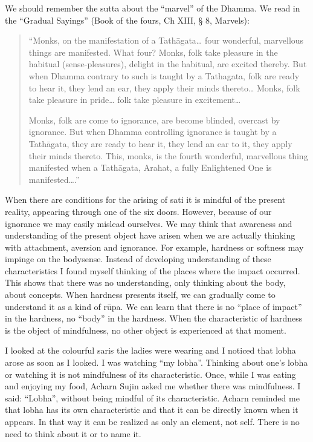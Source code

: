 We should remember the sutta about the ``marvel'' of the Dhamma. We read
in the ``Gradual Sayings'' (Book of the fours, Ch XIII, § 8, Marvels):

\begin{quote}
``Monks, on the manifestation of a Tathāgata\ldots{} four wonderful,
marvellous things are manifested. What four? Monks, folk take pleasure
in the habitual (sense-pleasures), delight in the habitual, are excited
thereby. But when Dhamma contrary to such is taught by a Tathagata, folk
are ready to hear it, they lend an ear, they apply their minds
thereto\ldots{} Monks, folk take pleasure in pride\ldots{} folk take
pleasure in excitement\ldots{}

Monks, folk are come to ignorance, are become blinded, overcast by
ignorance. But when Dhamma controlling ignorance is taught by a
Tathāgata, they are ready to hear it, they lend an ear to it, they apply
their minds thereto. This, monks, is the fourth wonderful, marvellous
thing manifested when a Tathāgata, Arahat, a fully Enlightened One is
manifested\ldots{}.''
\end{quote}

When there are conditions for the arising of sati it is mindful of the
present reality, appearing through one of the six doors. However,
because of our ignorance we may easily mislead ourselves. We may think
that awareness and understanding of the present object have arisen when
we are actually thinking with attachment, aversion and ignorance. For
example, hardness or softness may impinge on the bodysense. Instead of
developing understanding of these characteristics I found myself
thinking of the places where the impact occurred. This shows that there
was no understanding, only thinking about the body, about concepts. When
hardness presents itself, we can gradually come to understand it as a
kind of rūpa. We can learn that there is no ``place of impact'' in the
hardness, no ``body'' in the hardness. When the characteristic of
hardness is the object of mindfulness, no other object is experienced at
that moment.

I looked at the colourful saris the ladies were wearing and I noticed
that lobha arose as soon as I looked. I was watching ``my lobha''.
Thinking about one's lobha or watching it is not mindfulness of its
characteristic. Once, while I was eating and enjoying my food, Acharn
Sujin asked me whether there was mindfulness. I said: ``Lobha'', without
being mindful of its characteristic. Acharn reminded me that lobha has
its own characteristic and that it can be directly known when it
appears. In that way it can be realized as only an element, not self.
There is no need to think about it or to name it.

